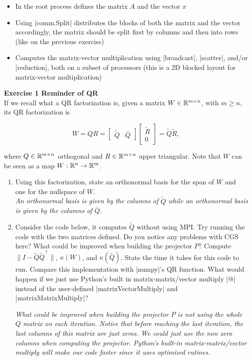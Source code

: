 \documentclass[11pt]{article}
\begin{document}
\begin{itemize}
   \item In the root process defines the matrix $A$ and the vector $x$
   \item Using |comm.Split| distributes the blocks of both the matrix and the vector accordingly, the matrix should be split first by columns and then into rows (like on the previous exercise)
   \item Computes the matrix-vector multiplication using |broadcast|, |scatter|, and/or |reduction|, both on a subset of processors (this is a 2D blocked layout for matrix-vector multiplication)
\end{itemize}

\bigskip

{\bf{Exercise 1 Reminder of QR}}\\

If we recall what a QR factorization is, given a matrix $W \in \mathbb{R}^{m \times n}$, with $m \geq n$, its QR factorization is

\[ W = QR = \begin{bmatrix} \tilde{Q} & \bar{Q} \end{bmatrix} \begin{bmatrix} \tilde{R} \\ 0 \end{bmatrix} = \tilde{Q}\tilde{R}, \]

where $Q \in \mathbb{R}^{m \times n}$ orthogonal and $R \in \mathbb{R}^{m \times n}$ upper triangular. Note that $W$ can be seen as a map $W: \mathbb{R}^{n} \to \mathbb{R}^{m}$. 

\begin{enumerate}
   \item Using this factorization, state an orthonormal basis for the span of $W$ and one for the nullspace of $W$. \\
   \textit{An orthonormal basis is given by the columns of } $\tilde{Q}$ \textit{while an orthonormal basis is given by the columns of } $ \bar{Q}$.
   \item Consider the code below, it computes $\tilde{Q}$ without using MPI. Try running the code with the two matrices defined. Do you notice any problems with CGS here? What could be improved when building the projector $P$? Compute $\|I - \tilde{Q}\tilde{Q}^\top\|$, $\kappa(W)$, and $\kappa(\tilde{Q})$. State the time it takes for this code to run. Compare this implementation with |numpy|'s QR function. What would happen if we just use Python's built in matrix-matrix/vector multiply |@| instead of the user-defined |matrixVectorMultiply| and |matrixMatrixMultiply|?
    
   
   \textit{What could be improved when building the projector} $P$ \textit{is not using the whole} $Q$ \textit{matrix on each iteration. Notice that before reaching the last iteration, the last columns of this matrix are just zeros. We could just use the non zero columns when computing the projector. Python's built-in matrix-matrix/vector multiply will make our code faster since it uses optimized rutines.}
\end{enumerate}
\end{document}
